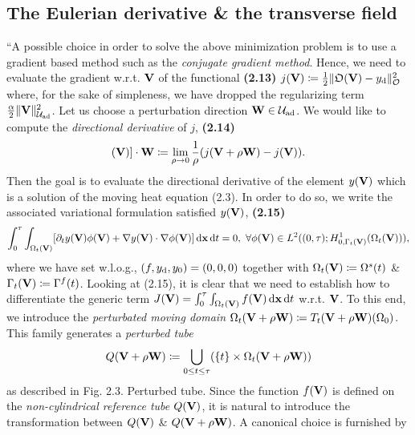 \documentclass[oneside]{book}
\numberwithin{equation}{section}
\begin{document}
\subsection{The Eulerian derivative \& the transverse field}
``A possible choice in order to solve the above minimization problem is to use a gradient based method such as the \textit{conjugate gradient method}. Hence, we need to evaluate the gradient w.r.t. ${\bf V}$ of the functional \textbf{(2.13)} $j({\bf V})\coloneqq\frac{1}{2}\|\mathfrak{O}({\bf V}) - y_{\rm d}\|_{\mathcal{O}}^2$ where, for the sake of simpleness, we have dropped the regularizing term $\frac{\alpha}{2}\|{\bf V}\|_{\mathcal{U}_{\rm ad}}^2$. Let us choose a perturbation direction ${\bf W}\in\mathcal{U}_{\rm ad}$. We would like to compute the \textit{directional derivative} of $j$, \textbf{(2.14)}
\begin{align*}
	[{\rm D}_{\bf V}[j]({\bf V})]\cdot{\bf W}\coloneqq\lim_{\rho\to 0} \frac{1}{\rho}(j({\bf V} + \rho{\bf W}) - j({\bf V})).
\end{align*}
Then the goal is to evaluate the directional derivative of the element $y({\bf V})$ which is a solution of the moving heat equation (2.3). In order to do so, we write the associated variational formulation satisfied $y({\bf V})$, \textbf{(2.15)}
\begin{align*}
	\int_0^\tau\int_{\Omega_t({\bf V})} [\partial_ty({\bf V})\phi({\bf V}) + \nabla y({\bf V})\cdot\nabla\phi({\bf V})]\,{\rm d}{\bf x}\,{\rm d}t = 0,\ \forall\phi({\bf V})\in L^2((0,\tau);H_{0,\Gamma_t({\bf V})}^1(\Omega_t({\bf V}))),
\end{align*}
where we have set w.l.o.g., $(f,y_{\rm d},y_0) = (0,0,0)$ together with $\Omega_t({\bf V})\coloneqq\Omega^s(t)$ \& $\Gamma_t({\bf V})\coloneqq\Gamma^f(t)$. Looking at (2.15), it is clear that we need to establish how to differentiate the generic term $J({\bf V}) = \int_0^\tau\int_{\Omega_t({\bf V})} f({\bf V})\,{\rm d}{\bf x}\,{\rm d}t$ w.r.t. ${\bf V}$. To this end, we introduce the \textit{perturbated moving domain} $\Omega_t({\bf V} + \rho{\bf W})\coloneqq T_t({\bf V} + \rho{\bf W})(\Omega_0)$. This family generates a \textit{perturbed tube}
\begin{align*}
	Q({\bf V} + \rho{\bf W})\coloneqq\bigcup_{0\le t\le\tau} (\{t\}\times\Omega_t({\bf V} + \rho{\bf W}))
\end{align*}
as described in \textsf{Fig. 2.3. Perturbed tube.} Since the function $f({\bf V})$ is defined on the \textit{non-cylindrical reference tube} $Q({\bf V})$, it is natural to introduce the transformation between $Q({\bf V})$ \& $Q({\bf V} + \rho{\bf W})$. A canonical choice is furnished by
\end{document}
